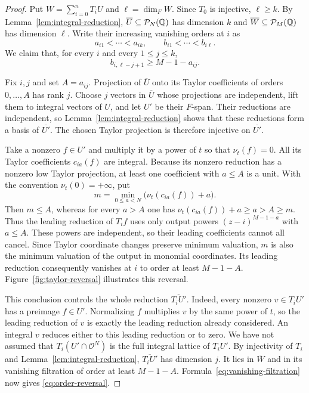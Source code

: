 \begin{proof}
Put $W=\sum_{i=0}^nT_iU$ and $\ell=\dim_FW$.  Since $T_0$ is
injective, $\ell\geq k$.  By Lemma~\ref{lem:integral-reduction},
$\overline U\subseteq\mathcal P_N(\mathbb Q)$ has dimension $k$ and
$\overline W\subseteq\mathcal P_M(\mathbb Q)$ has dimension $\ell$.
Write their increasing vanishing orders at $i$ as
\[
  a_{i1}<\cdots<a_{ik},
  \qquad
  b_{i1}<\cdots<b_{i\ell}.
\]
We claim that, for every $i$ and every $1\leq j\leq k$,
\begin{equation}
  b_{i,\ell-j+1}\geq M-1-a_{ij}.
  \label{eq:order-reversal}
\end{equation}

Fix $i,j$ and set $A=a_{ij}$.  Projection of $\overline U$ onto its
Taylor coefficients of orders $0,\ldots,A$ has rank $j$.  Choose $j$
vectors in $\overline U$ whose projections are independent, lift them
to integral vectors of $U$, and let $U'$ be their $F$-span.  Their
reductions are independent, so Lemma~\ref{lem:integral-reduction}
shows that these reductions form a basis of $\overline{U'}$.  The chosen Taylor
projection is therefore injective on $\overline{U'}$.

Take a nonzero $f\in U'$ and multiply it by a power of $t$ so that
$\nu_t(f)=0$.  All its Taylor coefficients $c_{ia}(f)$ are integral.
Because its nonzero reduction has a nonzero low Taylor projection,
at least one coefficient with $a\leq A$ is a unit.  With the convention
$\nu_t(0)=+\infty$, put
\[
  m=\min_{0\leq a<N}\bigl(\nu_t(c_{ia}(f))+a\bigr).
\]
Then $m\leq A$, whereas for every $a>A$ one has
$\nu_t(c_{ia}(f))+a\geq a>A\geq m$.  Thus the leading reduction of
$T_i f$ uses only output powers $(z-i)^{M-1-a}$ with $a\leq A$.
These powers are independent, so their leading coefficients cannot
all cancel.  Since Taylor coordinate changes preserve minimum
valuation, $m$ is also the minimum valuation of the output in monomial
coordinates.  Its leading reduction consequently vanishes at $i$
to order at least $M-1-A$. Figure~\ref{fig:taylor-reversal} illustrates this reversal.



This conclusion controls the whole reduction $\overline{T_iU'}$.
Indeed, every nonzero $v\in T_iU'$ has a preimage $f\in U'$.  Normalizing
$f$ multiplies $v$ by the same power of $t$, so the leading reduction
of $v$ is exactly the leading reduction already considered.  An integral
$v$ reduces either to this leading reduction or to zero.  We have not
assumed that $T_i(U'\cap\mathcal O^N)$ is the full integral lattice of
$T_iU'$.  By injectivity of $T_i$ and
Lemma~\ref{lem:integral-reduction}, $\overline{T_iU'}$ has dimension $j$.
It lies in $\overline W$ and in its vanishing filtration of order at
least $M-1-A$.  Formula~\eqref{eq:vanishing-filtration} now gives
\eqref{eq:order-reversal}.


\end{proof}
